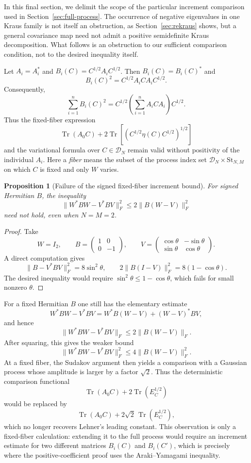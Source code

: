 \documentclass{article}
\newtheorem{proposition}[theorem]{Proposition}
\newcommand{\DN}{\mathcal D_N}
\newcommand{\St}{\mathrm{St}}
\DeclareMathOperator{\Tr}{Tr}
\begin{document}
In this final section, we delimit the scope of the particular increment
comparison used in Section~\ref{sec:full-process}.  The occurrence of negative
eigenvalues in one Kraus family is not itself an obstruction, as
Section~\ref{sec:rekraus} shows, but a general covariance map need not admit a
positive semidefinite Kraus decomposition.  What follows is an obstruction to
our sufficient comparison condition, not to the desired inequality itself.

Let $A_i=A_i^*$ and $B_i(C)=C^{1/2}A_iC^{1/2}$.  Then $B_i(C)=B_i(C)^*$ and
\[
	B_i(C)^2=C^{1/2}A_iCA_iC^{1/2}.
\]
Consequently,
\[
	\sum_{i=1}^nB_i(C)^2
	=C^{1/2}\left(\sum_{i=1}^nA_iCA_i\right)C^{1/2}.
\]
Thus the fixed-fiber expression
\[
	\Tr(A_0C)+2\Tr\left[\left(C^{1/2}\eta(C)C^{1/2}\right)^{1/2}\right]
\]
and the variational formula over $C\in\DN$ remain valid without positivity of the
individual $A_i$.  Here a \emph{fiber} means the subset of the process index
set \(\DN\times\St_{N,M}\) on which \(C\) is fixed and only \(W\) varies.

\begin{proposition}[Failure of the signed fixed-fiber increment bound]
	\label{prop:signed-increment-failure}
	For signed Hermitian \(B\), the inequality
	\[
		\|W^*BW-V^*BV\|_F^2\le2\|B(W-V)\|_F^2
	\]
	need not hold, even when \(N=M=2\).
\end{proposition}

\begin{proof}
	Take
	\[
		W=I_2,
		\qquad
		B=\begin{pmatrix}1&0\\0&-1\end{pmatrix},
		\qquad
		V=\begin{pmatrix}\cos\theta & -\sin\theta \\
               \sin\theta & \cos\theta\end{pmatrix}.
	\]
	A direct computation gives
	\[
		\|B-V^*BV\|_F^2=8\sin^2\theta,
		\qquad
		2\|B(I-V)\|_F^2=8(1-\cos\theta).
	\]
	The desired inequality would require
	\(\sin^2\theta\le1-\cos\theta\), which fails for small nonzero
	\(\theta\).
\end{proof}

For a fixed Hermitian $B$ one still has the elementary estimate
\[
	W^*BW-V^*BV=W^*B(W-V)+(W-V)^*BV,
\]
and hence
\[
	\|W^*BW-V^*BV\|_F\le2\|B(W-V)\|_F.
\]
After squaring, this gives the weaker bound
\[
	\|W^*BW-V^*BV\|_F^2\le4\|B(W-V)\|_F^2.
\]
At a fixed fiber, the Sudakov argument then yields a comparison with a Gaussian
process whose amplitude is larger by a factor $\sqrt2$.  Thus the deterministic
comparison functional
\[
	\Tr(A_0C)+2\Tr(E_C^{1/2})
\]
would be replaced by
\[
	\Tr(A_0C)+2\sqrt2\,\Tr(E_C^{1/2}),
\]
which no longer recovers Lehner's leading constant.  This observation is only a
fixed-fiber calculation: extending it to the full process would require an
increment estimate for two different matrices $B_i(C)$ and $B_i(C')$, which is
precisely where the positive-coefficient proof uses the Araki--Yamagami
inequality.
\end{document}
